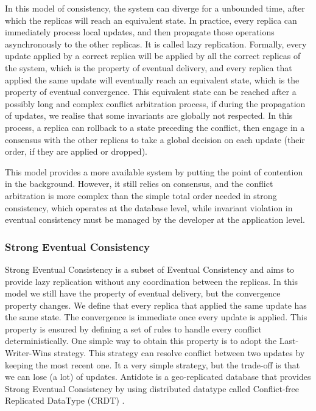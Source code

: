 \documentclass[11pt]{article}
\begin{document}
In this model of consistency, the system can diverge for a unbounded time,
after which the replicas will reach an equivalent state. In practice, every
replica can immediately process local updates, and then propagate those
operations asynchronously to the other replicas. It is called lazy
replication. Formally, every update applied by a correct replica will be
applied by all the correct replicas of the system, which is the property of
eventual delivery, and every replica that applied the same update will
eventually reach an equivalent state, which is the property of eventual
convergence. This equivalent state can be reached after a possibly long and
complex conflict arbitration process, if during the propagation of updates, we
realise that some invariants are globally not respected. In this process, a
replica can rollback to a state preceding the conflict, then engage in a
consensus with the other replicas to take a global decision on each update
(their order, if they are applied or dropped).

This model provides a more available system by putting the point of contention
in the background. However, it still relies on consensus, and the conflict
arbitration is more complex than the simple total order needed in strong
consistency, which operates at the database level, while invariant violation
in eventual consistency must be managed by the developer at the application
level.

\subsubsection{Strong Eventual Consistency}

Strong Eventual Consistency is a subset of Eventual Consistency and aims to
provide lazy replication without any coordination between the replicas. In
this model we still have the property of eventual delivery, but the
convergence property changes. We define that every replica that applied the
same update has the same state. The convergence is immediate once every update
is applied. This property is ensured by defining a set of rules to handle
every conflict deterministically. One simple way to obtain this property is to
adopt the Last-Writer-Wins strategy. This strategy can resolve conflict
between two updates by keeping the most recent one. It a very simple strategy,
but the trade-off is that we can lose (a lot) of updates. Antidote is a
geo-replicated database that provides Strong Eventual Consistency by using
distributed datatype called Conflict-free Replicated DataType (CRDT)
\cite{Shapiro2011}.
\end{document}
